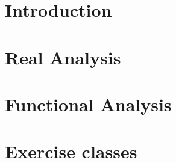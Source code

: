 \documentclass[10pt,a4paper,twoside]{book}
\numberwithin{figure}{chapter}
\numberwithin{equation}{chapter}
\begin{document}

\pagestyle{fancy}
\mainmatter

\part{Introduction}
 \cleardoublepage
 \cleardoublepage

\part{Real Analysis}
 \cleardoublepage
 \cleardoublepage
 \cleardoublepage
 \cleardoublepage
 \cleardoublepage
 \cleardoublepage
 \cleardoublepage
 \cleardoublepage
 \cleardoublepage

\part{Functional Analysis}
 \cleardoublepage
 \cleardoublepage
 \cleardoublepage
 \cleardoublepage
 \cleardoublepage
 \cleardoublepage
 \cleardoublepage
 \cleardoublepage

\part{Exercise classes}
 \cleardoublepage
 \cleardoublepage
 \cleardoublepage
 \cleardoublepage
 \cleardoublepage
 \cleardoublepage
 \cleardoublepage
 \cleardoublepage
 \cleardoublepage
 \cleardoublepage
\end{document}
